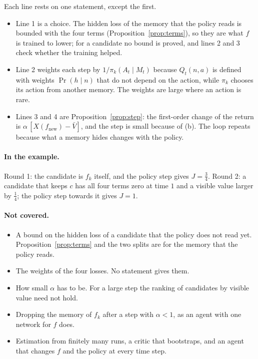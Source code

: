 \documentclass[11pt]{article}
\theoremstyle{definition}
\newcommand{\fn}{f_{\mathrm{new}}}
\begin{document}
Each line rests on one statement, except the first.
\begin{itemize}\setlength{\itemsep}{0pt}
\item Line 1 is a choice. The hidden loss of the memory that the policy reads is bounded with the four terms (Proposition~\ref{prop:terms}), so they are what $f$ is trained to lower; for a candidate no bound is proved, and lines 2 and 3 check whether the training helped.
\item Line 2 weights each step by $1/\pi_k(A_t\mid M_t)$ because $Q_t(n,a)$ is defined with weights $\Pr(h\mid n)$ that do not depend on the action, while $\pi_k$ chooses its action from another memory. The weights are large where an action is rare.
\item Lines 3 and 4 are Proposition~\ref{prop:step}: the first-order change of the return is $\alpha\,[X(\fn)-\bar V]$, and the step is small because of (b). The loop repeats because what a memory hides changes with the policy.
\end{itemize}

\paragraph{In the example.} Round 1: the candidate is $f_k$ itself, and the policy step gives $J=\tfrac34$. Round 2: a candidate that keeps $c$ has all four terms zero at time $1$ and a visible value larger by $\tfrac14$; the policy step towards it gives $J=1$.

\paragraph{Not covered.}
\begin{itemize}\setlength{\itemsep}{0pt}
\item A bound on the hidden loss of a candidate that the policy does not read yet. Proposition~\ref{prop:terms} and the two splits are for the memory that the policy reads.
\item The weights of the four losses. No statement gives them.
\item How small $\alpha$ has to be. For a large step the ranking of candidates by visible value need not hold.
\item Dropping the memory of $f_k$ after a step with $\alpha<1$, as an agent with one network for $f$ does.
\item Estimation from finitely many runs, a critic that bootstraps, and an agent that changes $f$ and the policy at every time step.
\end{itemize}
\end{document}
